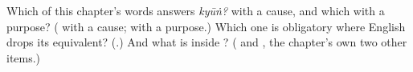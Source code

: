 \begin{tcolorbox}[breakable,colback=teal!4,colframe=teal!35!black,title={Before you move on}]
Which of this chapter's words answers \emph{kyūṅ?} with a cause, and which with a purpose? (\textbf{} with a cause; \textbf{ } with a purpose.) Which one is obligatory where English drops its equivalent? (\textbf{}.) And what is inside \textbf{}? (\textbf{} and \textbf{}, the chapter's own two other items.)
\end{tcolorbox}
